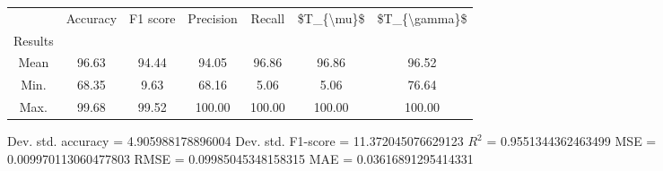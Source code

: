 \begin{tabular}{|c|c|c|c|c|c|c|}
\toprule
{} &  Accuracy &  F1 score &  Precision &  Recall &  \$T\_\{\textbackslash mu\}\$ &  \$T\_\{\textbackslash gamma\}\$ \\
Results &           &           &            &         &            &               \\
\hline
Mean    &     96.63 &     94.44 &      94.05 &   96.86 &      96.86 &         96.52 \\
Min.    &     68.35 &      9.63 &      68.16 &    5.06 &       5.06 &         76.64 \\
Max.    &     99.68 &     99.52 &     100.00 &  100.00 &     100.00 &        100.00 \\
\bottomrule
\end{tabular}

 Dev. std. accuracy = 4.905988178896004
 Dev. std. F1-score = 11.372045076629123
 $R^2$ = 0.9551344362463499
 MSE = 0.009970113060477803
 RMSE = 0.09985045348158315
 MAE = 0.03616891295414331